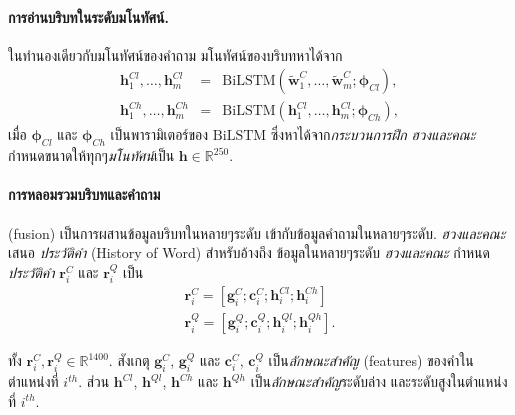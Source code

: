 \paragraph{การอ่านบริบทในระดับมโนทัศน์.}
ในทำนองเดียวกับมโนทัศน์ของคำถาม
มโนทัศน์ของบริบทหาได้จาก
%
\begin{eqnarray}
\bm{h}^{Cl}_1, \ldots, \bm{h}^{Cl}_m 
&=& \mathrm{BiLSTM}(\bm{\tilde{w}}^C_1, \ldots, \bm{\tilde{w}}^C_m; \bm{\phi}_{Cl}),
\label{eq: opt fusion net hC low}
\\
\bm{h}^{Ch}_1, \ldots, \bm{h}^{Ch}_m 
&=& \mathrm{BiLSTM}(\bm{h}^{Cl}_1, \ldots, \bm{h}^{Cl}_m; \bm{\phi}_{Ch}),
\label{eq: opt fusion net hC high}
\end{eqnarray}
เมื่อ $\bm{\phi}_{Cl}$ และ 
$\bm{\phi}_{Ch}$ เป็นพารามิเตอร์ของ $\mathrm{BiLSTM}$ ซึ่งหาได้จาก\textit{กระบวนการฝึก}
%
\textit{ฮวงและคณะ}\cite{HuangEtAl2017a}กำหนดขนาดให้ทุกๆ\textit{มโนทัศน์}เป็น $\bm{h} \in \mathbb{R}^{250}$. 

\paragraph{การหลอมรวมบริบทและคำถาม} (fusion)
เป็นการผสานข้อมูลบริบทในหลายๆระดับ เข้ากับข้อมูลคำถามในหลายๆระดับ.
\textit{ฮวงและคณะ}\cite{HuangEtAl2017a}เสนอ 
\textit{ประวัติคำ} (History of Word) สำหรับอ้างถึง ข้อมูลในหลายๆระดับ 
%
\textit{ฮวงและคณะ} กำหนด\textit{ประวัติคำ} $\bm{r}^C_i$ และ $\bm{r}^Q_i$ เป็น
%
\begin{eqnarray}
\bm{r}^C_i = [\bm{g}^C_i; \bm{c}^C_i; \bm{h}^{Cl}_i; \bm{h}^{Ch}_i]
\label{app fusion net HoW C}
\\
\bm{r}^Q_i = [\bm{g}^Q_i; \bm{c}^Q_i; \bm{h}^{Ql}_i; \bm{h}^{Qh}_i]
\label{app fusion net HoW Q} .
\end{eqnarray}

ทั้ง $\bm{r}^C_i, \bm{r}^Q_i \in \mathbb{R}^{1400}$.
สังเกตุ $\bm{g}^C_i$, $\bm{g}^Q_i$ และ $\bm{c}^C_i$, $\bm{c}^Q_i$ เป็น\textit{ลักษณะสำคัญ} (features) ของคำในตำแหน่งที่ $i^{th}$.
ส่วน $\bm{h}^{Cl}$, $\bm{h}^{Ql}$,
$\bm{h}^{Ch}$ และ $\bm{h}^{Qh}$
เป็น\textit{ลักษณะสำคัญ}ระดับล่าง
และระดับสูงในตำแหน่งที่ $i^{th}$.


